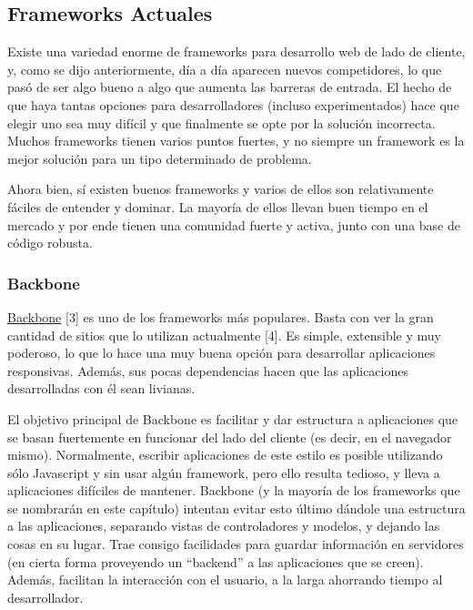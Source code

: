 \documentclass[12pt,titlepage,]{article}
\begin{document}
\subsection{Frameworks Actuales}

Existe una variedad enorme de frameworks para desarrollo web de lado de
cliente, y, como se dijo anteriormente, día a día aparecen nuevos
competidores, lo que pasó de ser algo bueno a algo que aumenta las
barreras de entrada. El hecho de que haya tantas opciones para
desarrolladores (incluso experimentados) hace que elegir uno sea muy
difícil y que finalmente se opte por la solución incorrecta. Muchos
frameworks tienen varios puntos fuertes, y no siempre un framework es la
mejor solución para un tipo determinado de problema.

Ahora bien, sí existen buenos frameworks y varios de ellos son
relativamente fáciles de entender y dominar. La mayoría de ellos llevan
buen tiempo en el mercado y por ende tienen una comunidad fuerte y
activa, junto con una base de código robusta.

\subsubsection{Backbone}

\href{http://backbonejs.org}{Backbone} {[}3{]} es uno de los frameworks
más populares. Basta con ver la gran cantidad de sitios que lo utilizan
actualmente {[}4{]}. Es simple, extensible y muy poderoso, lo que lo
hace una muy buena opción para desarrollar aplicaciones responsivas.
Además, sus pocas dependencias hacen que las aplicaciones desarrolladas
con él sean livianas.

El objetivo principal de Backbone es facilitar y dar estructura a
aplicaciones que se basan fuertemente en funcionar del lado del cliente
(es decir, en el navegador mismo). Normalmente, escribir aplicaciones de
este estilo es posible utilizando sólo Javascript y sin usar algún
framework, pero ello resulta tedioso, y lleva a aplicaciones difíciles
de mantener. Backbone (y la mayoría de los frameworks que se nombrarán
en este capítulo) intentan evitar esto último dándole una estructura a
las aplicaciones, separando vistas de controladores y modelos, y dejando
las cosas en su lugar. Trae consigo facilidades para guardar información
en servidores (en cierta forma proveyendo un ``backend'' a las
aplicaciones que se creen). Además, facilitan la interacción con el
usuario, a la larga ahorrando tiempo al desarrollador.
\end{document}
